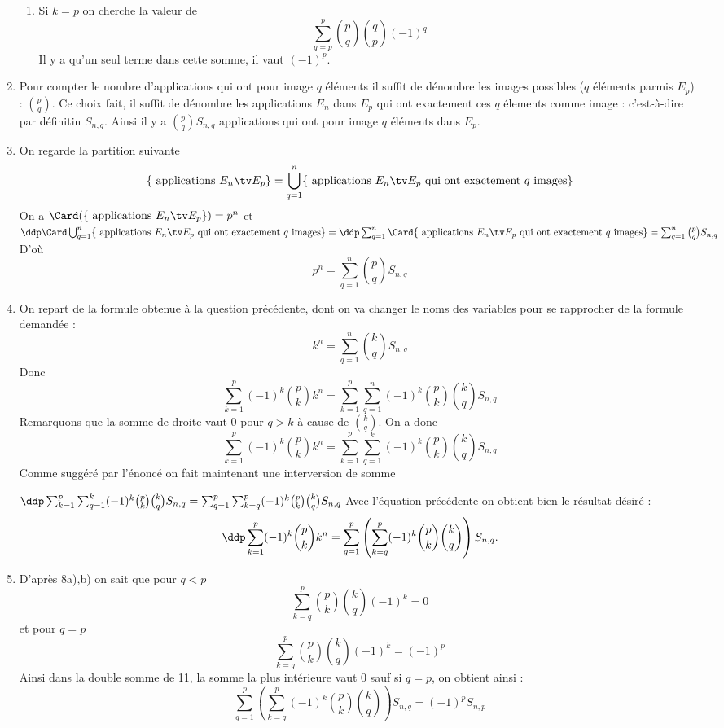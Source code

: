 \begin{correction}
\begin{enumerate}
\begin{enumerate}
\item  Si $k=p$ on  cherche la valeur de 
$$\sum_{q=p}^p \binom{p}{q}\binom{q}{p} (-1)^q $$
Il y a qu'un seul terme dans cette somme, il vaut $(-1)^p$. 
\end{enumerate}

\item Pour compter le nombre d'applications qui ont pour image $q$ éléments il suffit de dénombre les images possibles ($q$ éléments parmis $E_p$) : $\binom{p}{q}$. Ce choix fait, il suffit de dénombre les applications $E_n$ dans $E_p$ qui ont exactement ces $q$ élements comme image : c'est-à-dire par définitin $S_{n,q}$. Ainsi  il y a $\binom{p}{q}S_{n,q}$ applications qui ont pour image $q$ éléments dans $E_p$. 

\item On regarde la partition suivante 
$$\{\text{ applications } E_n \tv E_p\} =\bigcup_{q=1}^n \{\text{ applications } E_n \tv E_p \text{ qui ont exactement $q$ images} \} $$
On a $\Card(\{\text{ applications } E_n \tv E_p\}) =p^n$ et \\
$\ddp \Card \bigcup_{q=1}^n \{\text{ applications } E_n \tv E_p \text{ qui ont exactement $q$ images} \}  = \ddp \sum_{q=1}^n \Card  \{\text{ applications } E_n \tv E_p \text{ qui ont exactement $q$ images} \} =\sum_{q=1}^n \binom{p}{q}S_{n,q}$
D'où 
$$p^n =\sum_{q=1}^n \binom{p}{q}S_{n,q}$$
\item 
On repart de la formule obtenue à la question précédente, dont on  va changer le noms des variables pour se rapprocher de la formule demandée : 
$$k^n =\sum_{q=1}^n \binom{k}{q}S_{n,q}$$
Donc 
$$\sum_{k=1}^p (-1)^k \binom{p}{k} k^n  = \sum_{k=1}^p \sum_{q=1}^n  (-1)^k \binom{p}{k} \binom{k}{q}S_{n,q}$$
Remarquons que la somme de droite vaut $0$ pour $q>k$ à cause de $\binom{k}{q}$. On a donc 
$$\sum_{k=1}^p (-1)^k \binom{p}{k} k^n  = \sum_{k=1}^p \sum_{q=1}^k  (-1)^k \binom{p}{k} \binom{k}{q}S_{n,q}$$
Comme suggéré par l'énoncé on fait maintenant une interversion de somme 

$\ddp \sum_{k=1}^p \sum_{q=1}^k  (-1)^k \binom{p}{k} \binom{k}{q}S_{n,q}=\sum_{q=1}^p \sum_{k=q}^p  (-1)^k \binom{p}{k} \binom{k}{q}S_{n,q}$
Avec l'équation précédente on obtient bien le résultat désiré :
$$\ddp \sum_{k=1}^p (-1)^k \binom{p}{k}k^n=\sum_{q=1}^p \left(\sum_{k=q}^p (-1)^k \binom{p}{k}\binom{k}{q} \right) S_{n,q} .$$
\item D'après 8a),b) on sait que pour $q<p$
$$\sum_{k=q}^p \binom{p}{k}\binom{k}{q} (-1)^k = 0$$
et pour $q=p$ 
$$\sum_{k=q}^p \binom{p}{k}\binom{k}{q} (-1)^k = (-1)^p$$
Ainsi dans la double somme de 11, la somme la plus intérieure vaut $0$ sauf si $q=p$, on obtient ainsi : 
$$\sum_{q=1}^p \left(\sum_{k=q}^p (-1)^k \binom{p}{k}\binom{k}{q} \right) S_{n,q} = (-1)^pS_{n,p}$$


\end{enumerate}
\end{correction}
